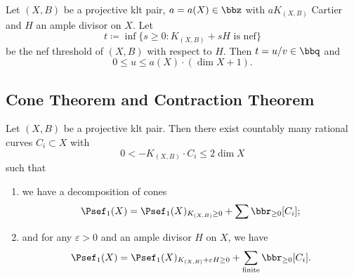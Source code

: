     \begin{theorem}\label{thm: rationality theorem}
        Let \((X,B)\) be a projective klt pair, \(a = a(X) \in \bbz\) with \(aK_{(X,B)}\) Cartier and \(H\) an ample divisor on \(X\).
        Let 
        \[ t \coloneqq \inf \{s \geq 0: K_{(X,B)} + sH \text{ is nef}\} \]
        be the nef threshold of \((X,B)\) with respect to \(H\).
        Then \(t = u/v \in \bbq\) and 
        \[ 0 \leq u \leq a(X)\cdot (\dim X + 1). \]
    \end{theorem}


\subsection{Cone Theorem and Contraction Theorem}

    \begin{theorem}\label{thm: cone theorem}
        Let \((X,B)\) be a projective klt pair.
        Then there exist countably many rational curves \(C_i \subset X\) with 
        \[ 0 < -K_{(X,B)} \cdot C_i \leq 2 \dim X \]
        such that 
        \begin{enumerate}
            \item we have a decomposition of cones
            \[ \Psef_1(X) = \Psef_1(X)_{K_{(X,B)} \geq 0} + \sum \bbr_{\geq 0}[C_i]; \]
            \item and for any \(\varepsilon > 0\) and an ample divisor \(H\) on \(X\), we have 
            \[ \Psef_1(X) = \Psef_1(X)_{K_{(X,B)}+\varepsilon H \geq 0} + \sum_{\text{finite}} \bbr_{\geq 0}[C_i]. \]
        \end{enumerate}
    \end{theorem}
